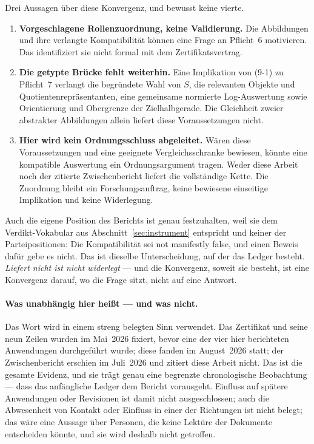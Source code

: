 \documentclass[11pt,a4paper]{article}
\theoremstyle{definition}
\begin{document}
Drei Aussagen über diese Konvergenz, und bewusst keine vierte.

\begin{enumerate}
\item \textbf{Vorgeschlagene Rollenzuordnung, keine Validierung.} Die
  Abbildungen und ihre verlangte Kompatibilität können eine Frage an Pflicht~6
  motivieren. Das identifiziert sie nicht formal mit dem Zertifikatsvertrag.
\item \textbf{Die getypte Brücke fehlt weiterhin.} Eine Implikation von (9-1)
  zu Pflicht~7 verlangt die begründete Wahl von $S$, die relevanten Objekte und
  Quotientenrepräsentanten, eine gemeinsame normierte Log-Auswertung sowie
  Orientierung und Obergrenze der Zielhalbgerade. Die Gleichheit zweier
  abstrakter Abbildungen allein liefert diese Voraussetzungen nicht.
\item \textbf{Hier wird kein Ordnungsschluss abgeleitet.} Wären diese
  Voraussetzungen und eine geeignete Vergleichsschranke bewiesen, könnte
  eine kompatible Auswertung ein Ordnungsargument tragen. Weder diese Arbeit
  noch der zitierte Zwischenbericht liefert die vollständige Kette.
  Die Zuordnung bleibt ein Forschungsauftrag, keine bewiesene einseitige
  Implikation und keine Widerlegung.
\end{enumerate}

Auch die eigene Position des Berichts ist genau festzuhalten, weil sie dem
Verdikt-Vokabular aus Abschnitt~\ref{sec:instrument} entspricht und keiner der
Parteipositionen: Die Kompatibilität sei \glqq not manifestly false\grqq, und einen Beweis
dafür gebe es nicht. Das ist dieselbe Unterscheidung, auf der das Ledger besteht.
\emph{Liefert nicht ist nicht widerlegt} --- und die Konvergenz, soweit sie
besteht, ist eine Konvergenz darauf, wo die Frage sitzt, nicht auf eine Antwort.

\paragraph{Was \glqq unabhängig\grqq{} hier heißt --- und was nicht.} Das Wort wird in einem
streng belegten Sinn verwendet. Das Zertifikat und seine neun Zeilen wurden im
Mai~2026 fixiert, bevor eine der vier hier berichteten Anwendungen durchgeführt
wurde; diese fanden im August~2026 statt; der Zwischenbericht erschien im Juli~2026
und zitiert diese Arbeit nicht. Das ist die gesamte Evidenz, und sie trägt genau
eine begrenzte chronologische Beobachtung --- dass das anfängliche Ledger dem
Bericht vorausgeht. Einfluss auf spätere Anwendungen oder Revisionen ist damit
nicht ausgeschlossen; auch die Abwesenheit von Kontakt oder Einfluss in einer
der Richtungen ist nicht belegt;
das wäre eine Aussage über Personen, die keine Lektüre der Dokumente entscheiden
könnte, und sie wird deshalb nicht getroffen.
\end{document}
